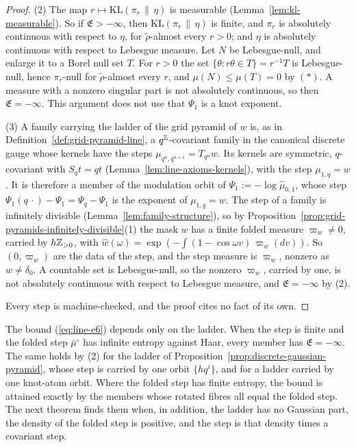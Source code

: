 \begin{proof}
(2) The map $r \mapsto \mathrm{KL}(\pi_r \,\|\, \eta)$ is measurable
(Lemma~\ref{lem:kl-measurable}). So if $\mathfrak{E} > -\infty$, then
$\mathrm{KL}(\pi_r \,\|\, \eta)$ is finite, and $\pi_r$ is absolutely continuous with respect to $\eta$, for $\tilde\rho$-almost every $r > 0$; and $\eta$ is absolutely continuous with respect to
Lebesgue measure. Let $N$ be Lebesgue-null, and enlarge it to a Borel null set $T$. For $r > 0$
the set $\{\theta : r\theta \in T\} = r^{-1}T$ is Lebesgue-null, hence $\pi_r$-null for
$\tilde\rho$-almost every $r$, and $\mu(N) \le \mu(T) = 0$ by $(*)$. A measure with a nonzero
singular part is not absolutely continuous, so then $\mathfrak{E} = -\infty$. This argument does not
use that $\Psi_1$ is a knot exponent.

(3) A family carrying the ladder of the grid pyramid of $w$ is, as in
Definition~\ref{def:grid-pyramid-line}, a $q^{\mathbb{Z}}$-covariant family in the canonical discrete
gauge whose kernels have the steps $\mu_{q^n,q^{n+1}} = T_{q^n}w$. Its kernels are symmetric,
$q$-covariant with $S_qt = qt$ (Lemma~\ref{lem:line-axioms-kernels}), with the step
$\mu_{1,q} = w$. It is
therefore a member of the modulation orbit of $\Psi_1 := -\log\widehat\mu_{0,1}$, whose step
$\Psi_1(q\,\cdot) - \Psi_1 = \Psi_q - \Psi_1$ is the exponent of $\mu_{1,q} = w$. The step of a
family is infinitely divisible (Lemma~\ref{lem:family-structure}), so by
Proposition~\ref{prop:grid-pyramids-infinitely-divisible}(1) the mask $w$ has a finite folded
\Levy{} measure $\varpi_w \ne 0$, carried by $h\mathbb{Z}_{>0}$, with
$\widehat w(\omega) = \exp(-\int(1 - \cos\omega v)\,\varpi_w(dv))$. So $(0, \varpi_w)$ are the data
of the step, and the step measure is $\varpi_w$, nonzero as $w \ne \delta_0$. A countable set is
Lebesgue-null, so the nonzero $\varpi_w$, carried by one, is not absolutely continuous with respect
to Lebesgue measure, and $\mathfrak{E} = -\infty$ by (2).

Every step is machine-checked, and the proof cites no fact of its own.
\end{proof}

The bound (\ref{eq:line-e6}) depends only on the ladder. When the step is finite and the folded step
$\bar\mu^\circ$ has infinite entropy against Haar, every member has $\mathfrak{E} = -\infty$. The same holds by (2) for the ladder of Proposition~\ref{prop:discrete-gaussian-pyramid},
whose step is carried by one orbit $\{hq^i\}$, and for a ladder carried by one knot-atom orbit.
Where the folded step has finite entropy, the bound is attained exactly by the members whose
rotated fibres all equal the folded step. The next theorem finds them when, in addition, the ladder
has no Gaussian part, the density of the folded step is positive, and the step is that density times
a covariant step.

